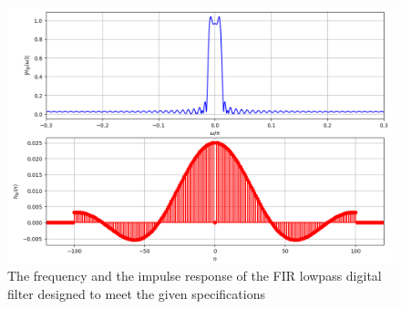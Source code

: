 \documentclass{article}
\begin{document}
\begin{figure}
\label{fig5}
\includegraphics[width = 15cm]{figs/figure5.png}
\caption{The frequency and the impulse response of the FIR lowpass digital filter designed to meet the given specifications} 
\end{figure}
\end{document}
